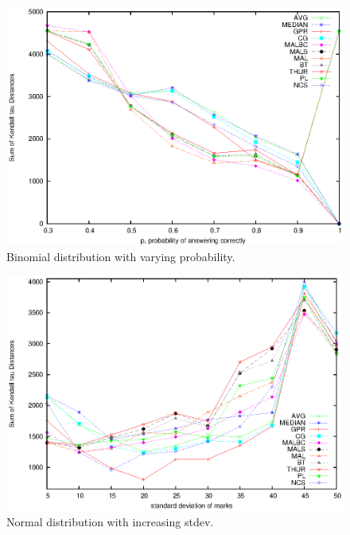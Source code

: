 \documentclass[a4paper]{article}
\begin{document}
\begin{figure}[hb]
\centering
\includegraphics[width=1\textwidth]{figure1}
\caption{Binomial distribution with varying probability.}
\end{figure}

\newpage
\begin{figure}[H]
\centering
\includegraphics[width=1\textwidth]{figure2}
\caption{Normal distribution with increasing stdev.}
\end{figure}
\end{document}
